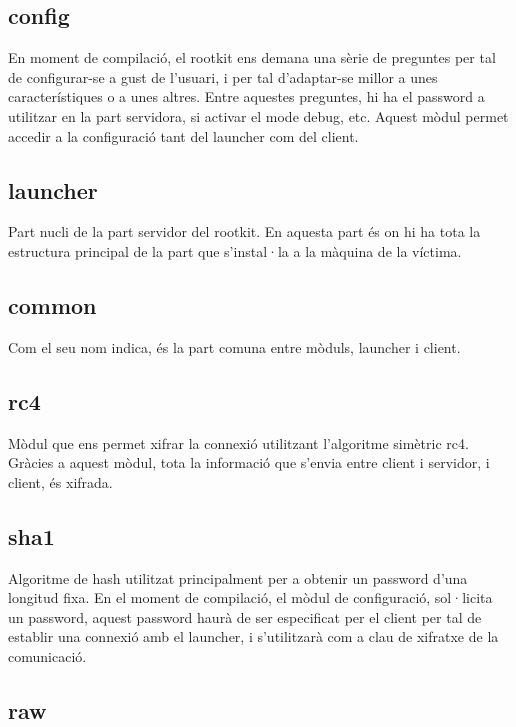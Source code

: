 \subsection{config}

En moment de compilació, el rootkit ens demana una sèrie de preguntes per tal de configurar-se a gust
de l'usuari, i per tal d'adaptar-se millor a unes característiques o a unes altres. Entre aquestes
preguntes, hi ha el password a utilitzar en la part servidora, si activar el mode debug, etc. Aquest
mòdul permet accedir a la configuració tant del launcher com del client.

\subsection{launcher}

Part nucli de la part servidor del rootkit. En aquesta part és on hi ha tota la estructura principal
de la part que s'instal·la a la màquina de la víctima.

\subsection{common}

Com el seu nom indica, és la part comuna entre mòduls, launcher i client.

\subsection{rc4}

Mòdul que ens permet xifrar la connexió utilitzant l'algoritme simètric rc4. Gràcies a aquest mòdul,
tota la informació que s'envia entre client i servidor, i client, és xifrada. 

\subsection{sha1}

Algoritme de hash utilitzat principalment per a obtenir un password d'una longitud fixa. En el moment
de compilació, el mòdul de configuració, sol·licita un password, aquest password haurà de ser especificat
per el client per tal de establir una connexió amb el launcher, i s'utilitzarà com a clau de xifratxe
de la comunicació.

\subsection{raw}

